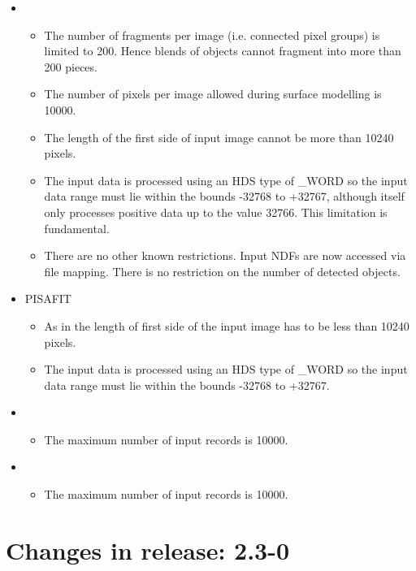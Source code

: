 \begin{itemize}
   \item {}
   \begin{itemize}
      \item The number of fragments per image (i.e. connected pixel groups)
            is limited to 200. Hence blends of objects cannot fragment into
            more than 200 pieces.
      \item The number of pixels per image allowed during surface modelling
            is 10000.
      \item The length of the first side of input image cannot be more than
            10240 pixels.
      \item The input data is processed using an HDS type of \_WORD so the input
            data range must lie within the bounds -32768 to +32767,
            although  itself only processes positive data up to
            the value 32766. This limitation is fundamental.
      \item There are no other known restrictions. Input NDFs are now accessed
            via file mapping. There is no restriction on the number of detected
            objects.
    \end{itemize}
    \item PISAFIT
    \begin{itemize}
       \item As in  the length of first side of the input image
             has to be less than 10240 pixels.
       \item The input data is processed using an HDS type of \_WORD so the input
             data range must lie within the bounds -32768 to +32767.
    \end{itemize}
    \item {}
    \begin{itemize}
       \item The maximum number of input records is 10000.
    \end{itemize}
    \item {}
    \begin{itemize}
       \item The maximum number of input records is 10000.
    \end{itemize}
\end{itemize}

\section{Changes in release: 2.3-0}

